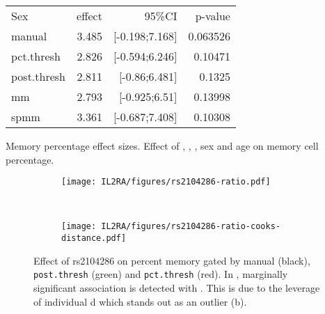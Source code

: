 \begin{table}[h]
\begin{tabular}{lrrr}
\rowcolor{Gray}
Sex              & effect & 95\%CI         & p-value\\
manual           & 3.485  & [-0.198;7.168] & 0.063526\\
pct.thresh       & 2.826  & [-0.594;6.246] & 0.10471\\
post.thresh      & 2.811  & [-0.86;6.481]  & 0.1325\\
mm               & 2.793  & [-0.925;6.51]  & 0.13998\\
spmm             & 3.361  & [-0.687;7.408] & 0.10308\\
\end{tabular} 
{Memory percentage effect sizes.}
{
Effect of , , , sex and age on memory cell percentage.
}
\end{table}


\begin{figure}[h]
\centering
\begin{subfigure}[b]{.5\textwidth}
    \centering
    \texttt{[image: IL2RA/figures/rs2104286-ratio.pdf]}
    \caption{}
\end{subfigure}
~
\begin{subfigure}[b]{.5\textwidth}
    \centering
    \texttt{[image: IL2RA/figures/rs2104286-ratio-cooks-distance.pdf]}
    \caption{}
\end{subfigure}
{Effect of rs2104286 on percent memory gated by manual (black), \texttt{post.thresh} (green) and \texttt{pct.thresh} (red).}
{
  In , marginally significant association is detected with .
  This is due to the leverage of individual d which stands out as an outlier (b).
}
\end{figure}


